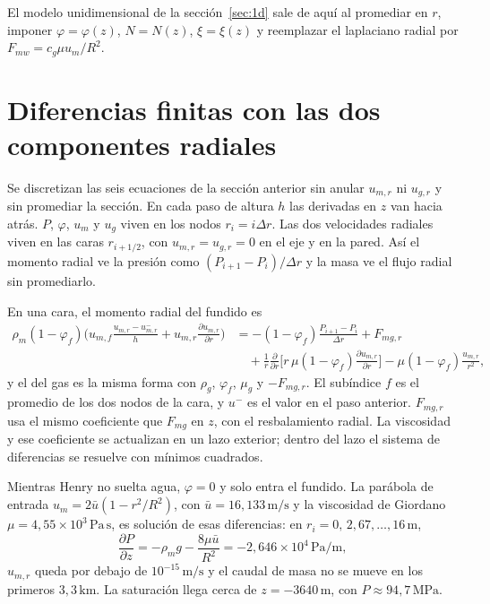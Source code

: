 \documentclass[11pt,a4paper]{article}
\newcommand{\p}{\partial}
\begin{document}
El modelo unidimensional de la sección~\ref{sec:1d} sale de aquí al
promediar en $r$, imponer $\varphi=\varphi(z)$, $N=N(z)$,
$\xi=\xi(z)$ y reemplazar el laplaciano radial por
$F_{mw}=c_g\mu u_m/R^2$.

\section{Diferencias finitas con las dos componentes radiales}
\label{sec:ur}

Se discretizan las seis ecuaciones de la sección anterior sin
anular $u_{m,r}$ ni $u_{g,r}$ y sin promediar la sección. En cada
paso de altura $h$ las derivadas en $z$ van hacia atrás. $P$,
$\varphi$, $u_m$ y $u_g$ viven en los nodos $r_i=i\Delta r$. Las dos
velocidades radiales viven en las caras $r_{i+1/2}$, con
$u_{m,r}=u_{g,r}=0$ en el eje y en la pared. Así el momento radial
ve la presión como $(P_{i+1}-P_i)/\Delta r$ y la masa ve el flujo
radial sin promediarlo.

En una cara, el momento radial del fundido es
\begin{equation}
\label{eq:mom-r-fd}
\begin{aligned}
\rho_m(1-\varphi_f)
\Biggl(
u_{m,f}\frac{u_{m,r}-u_{m,r}^{-}}{h}
+u_{m,r}\frac{\p u_{m,r}}{\p r}
\Biggr)
&=
-(1-\varphi_f)\frac{P_{i+1}-P_i}{\Delta r}
+F_{mg,r}
\\
&\quad
+\frac{1}{r}\frac{\p}{\p r}\Biggl[
r\,\mu(1-\varphi_f)\frac{\p u_{m,r}}{\p r}
\Biggr]
-\mu(1-\varphi_f)\frac{u_{m,r}}{r^2},
\end{aligned}
\end{equation}
y el del gas es la misma forma con $\rho_g$, $\varphi_f$, $\mu_g$ y
$-F_{mg,r}$. El subíndice $f$ es el promedio de los dos nodos de la
cara, y $u^{-}$ es el valor en el paso anterior. $F_{mg,r}$ usa el
mismo coeficiente que $F_{mg}$ en $z$, con el resbalamiento radial.
La viscosidad y ese coeficiente se actualizan en un lazo exterior;
dentro del lazo el sistema de diferencias se resuelve con
mínimos cuadrados.

Mientras Henry no suelta agua, $\varphi=0$ y solo entra el fundido.
La parábola de entrada $u_m=2\bar u(1-r^2/R^2)$, con
$\bar u=16{,}133\,\mathrm{m/s}$ y la viscosidad de Giordano
$\mu=4{,}55\times 10^3\,\mathrm{Pa\,s}$, es solución de esas
diferencias: en $r_i=0,\,2{,}67,\ldots,16\,\mathrm{m}$,
\begin{equation}
\frac{\p P}{\p z}
=
-\rho_m g-\frac{8\mu\bar u}{R^2}
=
-2{,}646\times 10^4\,\mathrm{Pa/m},
\end{equation}
$u_{m,r}$ queda por debajo de $10^{-15}\,\mathrm{m/s}$ y el caudal
de masa no se mueve en los primeros $3{,}3\,\mathrm{km}$. La
saturación llega cerca de $z=-3640\,\mathrm{m}$, con
$P\approx 94{,}7\,\mathrm{MPa}$.
\end{document}
